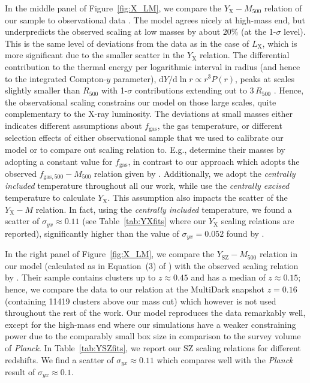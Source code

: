 \documentclass[traditabstract]{aa}
\newcommand{\rmn}{\mathrm}
\newcommand{\dd}{\mathrm{d}}
\begin{document}
In the middle panel of Figure~\ref{fig:X_LM}, we compare the $Y_{\rmn{X}}-M_{500}$
relation of our sample to observational data \citep{2010MNRAS.406.1773M}. The
model agrees nicely at high-mass end, but underpredicts the observed scaling at
low masses by about $20\%$ (at the 1-$\sigma$ level). This is the same level of
deviations from the data as in the case of $L_{\rmn{X}}$, which is more
significant due to the smaller scatter in the $Y_{\rmn{X}}$ relation. The
differential contribution to the thermal energy per logarithmic interval in
radius (and hence to the integrated Compton-$y$ parameter), $\dd Y /\dd\ln r
\propto r^3 P(r)$, peaks at scales slightly smaller than $R_{500}$ with
1-$\sigma$ contributions extending out to $3\,R_{500}$
\citep{2010ApJ...725...91B}. Hence, the observational scaling constrains our
model on those large scales, quite complementary to the X-ray luminosity. The
deviations at small masses either indicates different assumptions about
$f_{\rmn{gas}}$, the gas temperature, or different selection effects of either
observational sample that we used to calibrate our model or to compare out
scaling relation to. E.g., \cite{2010MNRAS.406.1773M} determine their masses by
adopting a constant value for $f_{\rmn{gas}}$, in contrast to our approach which
adopts the observed $f_{\rmn{gas},500}-M_{500}$ relation given by
\cite{2009ApJ...693.1142S}. Additionally, we adopt the \emph{centrally included}
temperature \cite{2010MNRAS.406.1773M} throughout all our work, while
\cite{2010MNRAS.406.1773M} use the \emph{centrally excised} temperature to
calculate $Y_{\rmn{X}}$. This assumption also impacts the scatter of the
$Y_{\rmn{X}}-M$ relation. In fact, using the \emph{centrally included}
temperature, we found a scatter of $\sigma_{yx} \approx 0.11$ (see
Table~\ref{tab:YXfits} where our $Y_{\rmn{X}}$ scaling relations are reported),
significantly higher than the value of $\sigma_{yx} = 0.052$ found by
\cite{2010MNRAS.406.1773M}.

In the right panel of Figure~\ref{fig:X_LM}, we compare the
$Y_{\rmn{SZ}}-M_{500}$ relation in our model (calculated as in Equation~(3) of
\citealp{2011arXiv1109.3709B}) with the observed scaling relation
by \cite{2011A&A...536A..11P}. Their sample contains clusters up to $z \approx
0.45$ and has a median of $z \approx 0.15$; hence, we compare the data to our
relation at the MultiDark snapshot $z=0.16$ (containing 11419 clusters above our mass cut) 
which however is not used throughout the rest of the work. Our model reproduces the data remarkably well, 
except for  the high-mass end where our simulations have a weaker constraining power due to the comparably 
small box size in comparison to the survey volume of {\em Planck}. In Table~\ref{tab:YSZfits},
we report our SZ scaling relations for different redshifts. We find a scatter
of $\sigma_{yx} \approx 0.11$ which compares well with the \emph{Planck} result
of $\sigma_{yx} \approx 0.1$.
 
\end{document}
